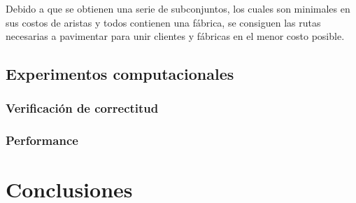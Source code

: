 \documentclass[a4paper, 10pt, twoside]{article}
\begin{document}
Debido a que se obtienen una serie de subconjuntos, los cuales son minimales en sus costos de aristas y todos contienen una fábrica, se consiguen las rutas necesarias a pavimentar para unir clientes y fábricas en el menor costo posible.

\subsection{Experimentos computacionales}
\subsubsection{Verificación de correctitud}

\subsubsection{Performance}





\newpage

\section{Conclusiones}






\newpage
\end{document}
